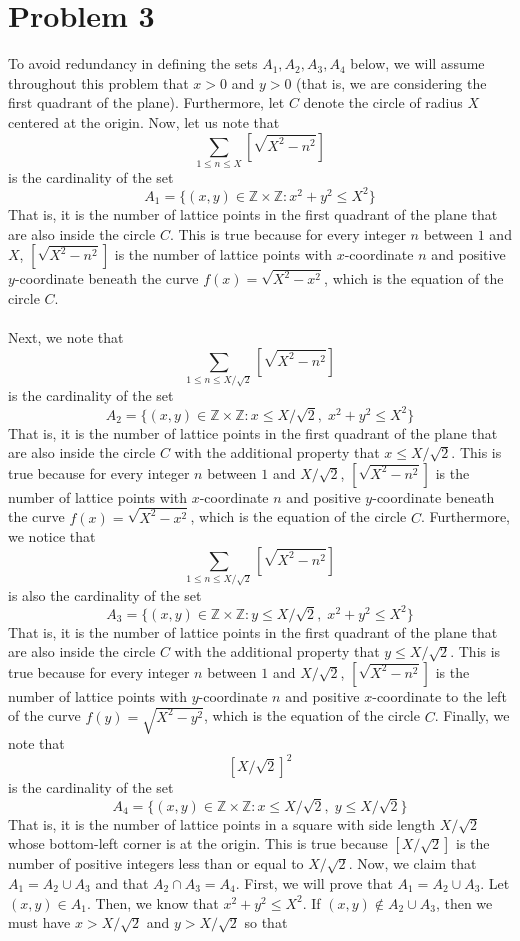 \documentclass[12pt]{article}
\newcommand{\Z}{\mathbb{Z}}
\begin{document}
\section*{Problem 3}
To avoid redundancy in defining the sets $A_1,A_2,A_3,A_4$ below, we will assume throughout this problem that $x > 0$ and $y > 0$ (that is, we are considering the first quadrant of the plane). Furthermore, let $C$ denote the circle of radius $X$ centered at the origin. Now, let us note that
\[
\sum_{1\leq n \leq X} [\sqrt{X^2 -n^2}]
\] is the cardinality of the set
\[
A_1 = \{ (x,y) \in \Z \times \Z: x^2 + y^2 \leq X^2\}
\] That is, it is the number of lattice points in the first quadrant of the plane that are also inside the circle $C$. This is true because for every integer $n$ between $1$ and $X$, $[\sqrt{X^2 - n^2}]$ is the number of lattice points with $x$-coordinate $n$ and positive $y$-coordinate beneath the curve $f(x) = \sqrt{X^2 - x^2}$, which is the equation of the circle $C$.
\\ \\
Next, we note that 
\[
\sum_{1 \leq n \leq X/\sqrt{2}} [\sqrt{X^2 - n^2}]
\]
is the cardinality of the set
\[
A_2 = \{(x,y) \in \Z \times \Z: x \leq X/\sqrt{2}, \; x^2 + y^2 \leq X^2\}
\] That is, it is the number of lattice points in the first quadrant of the plane that are also inside the circle $C$ with the additional property that $x \leq X/\sqrt{2}$. This is true because for every integer $n$ between $1$ and $X/\sqrt{2}$, $[\sqrt{X^2 - n^2}]$ is the number of lattice points with $x$-coordinate $n$ and positive $y$-coordinate beneath the curve $f(x) = \sqrt{X^2 - x^2}$, which is the equation of the circle $C$. Furthermore, we notice that
\[
\sum_{1 \leq n \leq X/\sqrt{2}} [\sqrt{X^2 - n^2}]
\] is also the cardinality of the set
\[
A_3 = \{(x,y) \in \Z \times \Z : y \leq X/\sqrt{2}, \; x^2 + y^2 \leq X^2\}
\] That is, it is the number of lattice points in the first quadrant of the plane that are also inside the circle $C$ with the additional property that $y \leq X/\sqrt{2}$. This is true because for every integer $n$ between $1$ and $X/\sqrt{2}$, $[\sqrt{X^2 - n^2}]$ is the number of lattice points with $y$-coordinate $n$ and positive $x$-coordinate to the left of the curve $f(y) = \sqrt{X^2 - y^2}$, which is the equation of the circle $C$. Finally, we note that 
\[
[X/\sqrt{2}]^2
\] is the cardinality of the set
\[
A_4 = \{(x,y) \in \Z \times \Z: x \leq X/\sqrt{2}, \; y \leq X/\sqrt{2}\}
\] That is, it is the number of lattice points in a square with side length $X/\sqrt{2}$ whose bottom-left corner is at the origin. This is true because $[X/\sqrt{2}]$ is the number of positive integers less than or equal to $X/\sqrt{2}$. Now, we claim that $A_1 = A_2 \cup A_3$ and that $A_2 \cap A_3 = A_4$. First, we will prove that $A_1 = A_2 \cup A_3$. Let $(x,y) \in A_1$. Then, we know that $x^2 + y^2 \leq X^2$. If $(x,y) \not \in A_2 \cup A_3$, then we must have $x > X/\sqrt{2}$ and $y > X/\sqrt{2}$ so that
\end{document}
